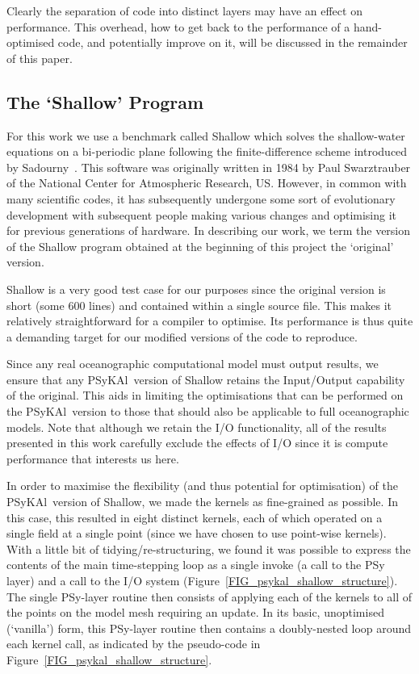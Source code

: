 \documentclass{IOS-Book-Article}
\newcommand{\psykal}{{PS}y{KA}l\ }
\begin{document}
Clearly the separation of code into distinct layers may have an effect
on performance. This overhead, how to get back to the performance
of a hand-optimised code, and potentially improve on it, will be
discussed in the remainder of this paper.

\subsection{The `Shallow' Program}

For this work we use a benchmark called Shallow which solves the
shallow-water equations on a bi-periodic plane following the
finite-difference scheme introduced by Sadourny~\cite{sadourny75}.
This software was originally written in 1984 by Paul Swarztrauber of
the National Center for Atmospheric Research, US.  However, in common
with many scientific codes, it has subsequently undergone some sort of
evolutionary development with subsequent people making various changes
and optimising it for previous generations of hardware.  In describing
our work, we term the version of the Shallow program obtained at the
beginning of this project the `original' version.

Shallow is a very good test case for our purposes since the original
version is short (some 600 lines) and contained within a single source
file. This makes it relatively straightforward for a compiler to
optimise. Its performance is thus quite a demanding target for our
modified versions of the code to reproduce.

Since any real oceanographic computational model must output results,
we ensure that any \psykal version of Shallow retains the Input/Output
capability of the original. This aids in limiting the optimisations
that can be performed on the \psykal version to those that should also
be applicable to full oceanographic models. Note that although we
retain the I/O functionality, all of the results presented in this work
carefully exclude the effects of I/O since it is compute performance
that interests us here.

In order to maximise the flexibility (and thus potential for
optimisation) of the \psykal version of Shallow, we made the kernels
as fine-grained as possible. In this case, this resulted in eight
distinct kernels, each of which operated on a single field at a single
point (since we have chosen to use point-wise kernels). With a little
bit of tidying/re-structuring, we found it was possible to express the
contents of the main time-stepping loop as a single invoke (a call to
the PSy layer) and a call to the I/O system
(Figure~\ref{FIG_psykal_shallow_structure}). The single PSy-layer
routine then consists of applying each of the kernels to all of the
points on the model mesh requiring an update. In its basic,
unoptimised (`vanilla') form, this PSy-layer routine then contains a
doubly-nested loop around each kernel call, as indicated by the
pseudo-code in Figure~\ref{FIG_psykal_shallow_structure}.
\end{document}
